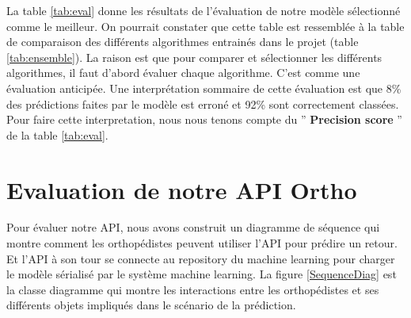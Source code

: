 \documentclass[12pt, french]{report}
\begin{document}
La table \ref{tab:eval} donne les résultats de l'évaluation de notre modèle sélectionné comme le meilleur. On pourrait constater que cette table est ressemblée à la table de comparaison des différents algorithmes entrainés dans le projet (table \ref{tab:ensemble}). La raison est que pour comparer et sélectionner les différents algorithmes, il faut d'abord évaluer chaque algorithme. C'est comme une évaluation anticipée. Une interprétation sommaire de cette évaluation est que 8\% des prédictions faites par le modèle est erroné et 92\% sont correctement classées. Pour faire cette interpretation, nous nous tenons compte du '' \textbf{Precision score} '' de la table \ref{tab:eval}. 

\section{Evaluation de notre API Ortho}
Pour évaluer notre API, nous avons construit un diagramme de séquence qui montre comment les orthopédistes peuvent utiliser l'API pour prédire un retour. Et l'API à son tour se connecte au repository du machine learning pour charger le modèle sérialisé par le système machine learning. La figure \ref{SequenceDiag} est la classe diagramme qui montre les interactions entre les orthopédistes et ses différents objets impliqués dans le scénario de la prédiction.
\end{document}
